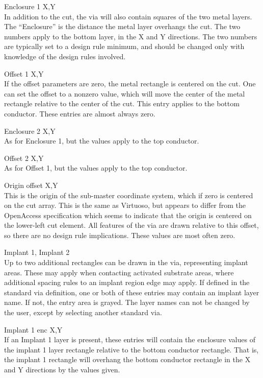 \begin{description}
\item{\cb Enclosure 1 X,Y}\\
In addition to the cut, the via will also contain squares of the two
metal layers.  The ``Enclosure'' is the distance the metal layer
overhangs the cut.  The two numbers apply to the bottom layer, in the
X and Y directions.  The two numbers are typically set to a design
rule minimum, and should be changed only with knowledge of the design
rules involved.

\item{\cb Offset 1 X,Y}\\
If the offset parameters are zero, the metal rectangle is centered on
the cut.  One can set the offset to a nonzero value, which will move
the center of the metal rectangle relative to the center of the cut. 
This entry applies to the bottom conductor.  These entries are almost
always zero.

\item{\cb Enclosure 2 X,Y}\\
As for {\cb Enclosure 1}, but the values apply to the top conductor.

\item{\cb Offset 2 X,Y}\\
As for {\cb Offset 1}, but the values apply to the top conductor.

\item{\cb Origin offset X,Y}\\
This is the origin of the sub-master coordinate system, which if zero
is centered on the cut array.  This is the same as Virtuoso, but
appears to differ from the OpenAccess specification which seems to
indicate that the origin is centered on the lower-left cut element. 
All features of the via are drawn relative to this offset, so there
are no design rule implications.  These values are most often zero.

\item{\cb Implant 1, Implant 2}\\
Up to two additional rectangles can be drawn in the via, representing
implant areas.  These may apply when contacting activated substrate
areas, where additional spacing rules to an implant region edge may
apply.  If defined in the standard via definition, one or both of
these entries may contain an implant layer name.  If not, the entry
area is grayed.  The layer names can not be changed by the user,
except by selecting another standard via.

\item{\cb Implant 1 enc X,Y}\\
If an {\cb Implant 1} layer is present, these entries will contain the
enclosure values of the implant 1 layer rectangle relative to the
bottom conductor rectangle.  That is, the implant 1 rectangle will
overhang the bottom conductor rectangle in the X and Y directions by
the values given.


\end{description}
